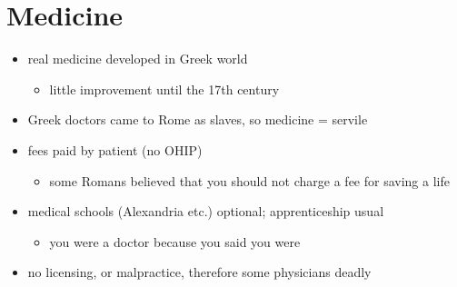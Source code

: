 \documentclass[12pt, twoside]{article}
\begin{document}
\section{Medicine}
\begin{itemize}
\item real medicine developed in Greek world
	\begin{itemize}
	\item little improvement until the 17th century
	\end{itemize}
\item Greek doctors came to Rome as slaves, so medicine = servile
\item fees paid by patient (no OHIP)
	\begin{itemize}
	\item some Romans believed that you should not charge a fee for saving a life
	\end{itemize}
\item medical schools (Alexandria etc.) optional; apprenticeship usual
	\begin{itemize}
	\item you were a doctor because you said you were
	\end{itemize}
\item no licensing, or malpractice, therefore some physicians deadly
\end{itemize}
\end{document}
